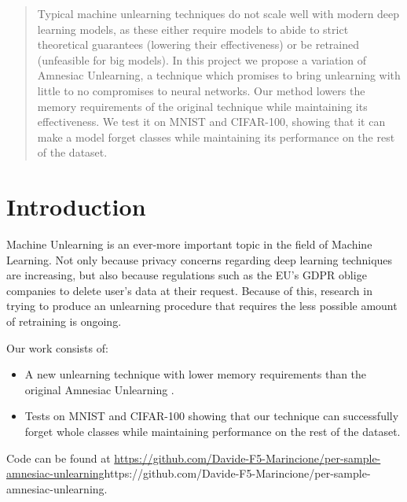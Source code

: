 \documentclass{article}
\begin{document}

\printAffiliationsAndNotice{}

\begin{abstract}
Typical machine unlearning techniques do not scale well with modern deep learning models, as these either require models to abide to strict theoretical guarantees (lowering their effectiveness) or be retrained (unfeasible for big models). In this project we propose a variation of Amnesiac Unlearning, a technique which promises to bring unlearning with little to no compromises to neural networks. Our method lowers the memory requirements of the original technique while maintaining its effectiveness. We test it on MNIST and CIFAR-100, showing that it can make a model forget classes while maintaining its performance on the rest of the dataset.
\end{abstract}
\section{Introduction}
Machine Unlearning is an ever-more important topic in the field of Machine Learning. Not only because privacy concerns regarding deep learning techniques are increasing, but also because regulations such as the EU's GDPR oblige companies to delete user's data at their request. Because of this, research in trying to produce an unlearning procedure that requires the less possible amount of retraining is ongoing.

Our work consists of:
\begin{itemize}
    \item A new unlearning technique with lower memory requirements than the original Amnesiac Unlearning \cite{graves2021amnesiac}.
    \item Tests on MNIST and CIFAR-100 showing that our technique can successfully forget whole classes while maintaining performance on the rest of the dataset.
\end{itemize}
Code can be found at \url{https://github.com/Davide-F5-Marincione/per-sample-amnesiac-unlearning}{https://github.com/Davide-F5-Marincione/per-sample-amnesiac-unlearning}.
\vfill
\end{document}
